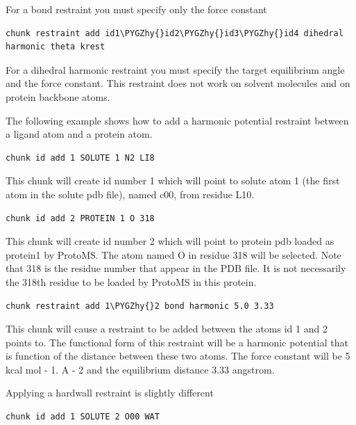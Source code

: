\documentclass[letterpaper,10pt,english]{sphinxmanual}
\def\PYGZhy{\char`\-}
\begin{document}
For a bond restraint you must specify only the force constant

\begin{Verbatim}[commandchars=\\\{\}]
chunk restraint add id1\PYGZhy{}id2\PYGZhy{}id3\PYGZhy{}id4 dihedral harmonic theta krest
\end{Verbatim}

For a dihedral harmonic restraint you must specify the target equilibrium angle and the force constant. This restraint does not work on solvent molecules and on protein backbone atoms.

The following example shows how to add a harmonic potential restraint between a ligand atom and a protein atom.

\begin{Verbatim}[commandchars=\\\{\}]
chunk id add 1 SOLUTE 1 N2 LI8
\end{Verbatim}

This chunk will create id number 1 which will point to solute atom 1 (the first atom in the solute pdb file), named c00, from residue L10.

\begin{Verbatim}[commandchars=\\\{\}]
chunk id add 2 PROTEIN 1 O 318
\end{Verbatim}

This chunk will create id number 2 which will point to protein pdb loaded as protein1 by ProtoMS. The atom named O in residue 318 will be selected. Note that 318 is the residue number that appear in the PDB file. It is not necessarily the 318th residue to be loaded by ProtoMS in this protein.

\begin{Verbatim}[commandchars=\\\{\}]
chunk restraint add 1\PYGZhy{}2 bond harmonic 5.0 3.33
\end{Verbatim}

This chunk will cause a restraint to be added between the atoms id 1 and 2 points to. The functional form of this restraint will be a harmonic potential that is function of the distance between these two atoms. The force constant will be 5 kcal mol - 1. A - 2 and the equilibrium distance 3.33 angstrom.

Applying a hardwall restraint is slightly different

\begin{Verbatim}[commandchars=\\\{\}]
chunk id add 1 SOLUTE 2 O00 WAT
\end{Verbatim}
\end{document}
